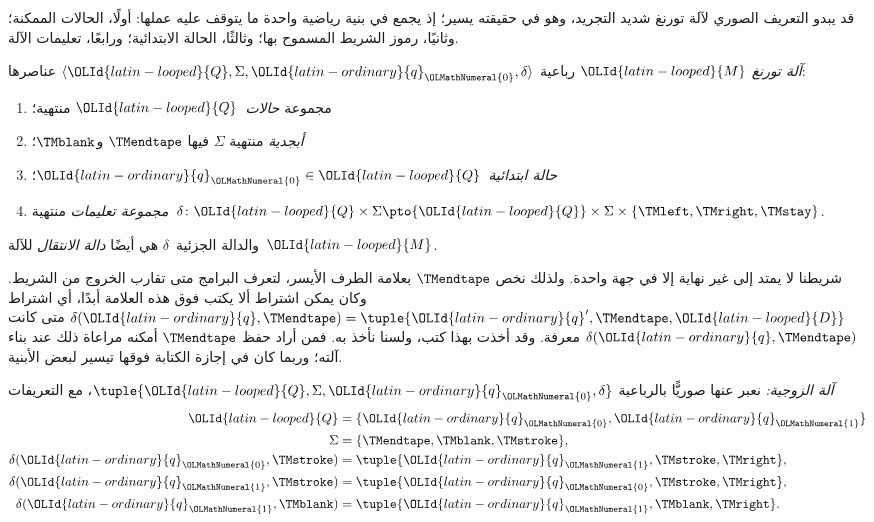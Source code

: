 \documentclass[../../../include/open-logic-section]{subfiles}
\begin{document}

\begin{explain}
قد يبدو التعريف الصوري لآلة تورنغ شديد التجريد، وهو في حقيقته يسير؛ إذ يجمع في بنية رياضية واحدة ما يتوقف عليه عملها: أولًا، الحالات الممكنة؛ وثانيًا، رموز الشريط المسموح بها؛ وثالثًا، الحالة الابتدائية؛ ورابعًا، تعليمات الآلة.
\end{explain}

\begin{defn}
\emph{آلة تورنغ} ${\OLId{latin-looped}{M}}$ رباعية $\langle {\OLId{latin-looped}{Q}},\Sigma,{\OLId{latin-ordinary}{q}}_{\OLMathNumeral{0}},\delta\rangle$ عناصرها:
\begin{enumerate}
\item مجموعة \emph{حالات}~${\OLId{latin-looped}{Q}}$ منتهية؛
\item \emph{أبجدية} منتهية $\Sigma$ فيها $\TMendtape$ و$\TMblank$؛
\item \emph{حالة ابتدائية}~${\OLId{latin-ordinary}{q}}_{\OLMathNumeral{0}} \in {\OLId{latin-looped}{Q}}$؛
\item \emph{مجموعة تعليمات} منتهية~$\delta\colon {\OLId{latin-looped}{Q}} \times \Sigma
  \pto {\OLId{latin-looped}{Q}} \times \Sigma \times \{\TMleft,\TMright,\TMstay\}$.
\end{enumerate}
والدالة الجزئية~$\delta$ هي أيضًا \emph{دالة الانتقال} للآلة~${\OLId{latin-looped}{M}}$.
\end{defn}

\begin{explain}
شريطنا لا يمتد إلى غير نهاية إلا في جهة واحدة. ولذلك نخص $\TMendtape$ بعلامة الطرف الأيسر، لتعرف البرامج متى تقارب الخروج من الشريط. وكان يمكن اشتراط ألا يكتب فوق هذه العلامة أبدًا، أي اشتراط $\delta({\OLId{latin-ordinary}{q}},\TMendtape)=\tuple{{\OLId{latin-ordinary}{q}}',\TMendtape,{\OLId{latin-looped}{D}}}$ متى كانت $\delta({\OLId{latin-ordinary}{q}},\TMendtape)$ معرفة. وقد أخذت بهذا كتب، ولسنا نأخذ به. فمن أراد حفظ $\TMendtape$ أمكنه مراعاة ذلك عند بناء آلته؛ وربما كان في إجازة الكتابة فوقها تيسير لبعض الأبنية.
\end{explain}

\begin{ex}
\emph{آلة الزوجية:} نعبر عنها صوريًّا بالرباعية $\tuple{{\OLId{latin-looped}{Q}},\Sigma,{\OLId{latin-ordinary}{q}}_{\OLMathNumeral{0}},\delta}$، مع التعريفات
\begin{align*}
{\OLId{latin-looped}{Q}} & = \{ {\OLId{latin-ordinary}{q}}_{\OLMathNumeral{0}}, {\OLId{latin-ordinary}{q}}_{\OLMathNumeral{1}} \} \\
\Sigma & = \{ \TMendtape, \TMblank, \TMstroke \}, \\
\delta({\OLId{latin-ordinary}{q}}_{\OLMathNumeral{0}}, \TMstroke) & = \tuple{{\OLId{latin-ordinary}{q}}_{\OLMathNumeral{1}}, \TMstroke, \TMright},\\
\delta({\OLId{latin-ordinary}{q}}_{\OLMathNumeral{1}}, \TMstroke) & = \tuple{{\OLId{latin-ordinary}{q}}_{\OLMathNumeral{0}}, \TMstroke, \TMright},\\
\delta({\OLId{latin-ordinary}{q}}_{\OLMathNumeral{1}}, \TMblank)  & = \tuple{{\OLId{latin-ordinary}{q}}_{\OLMathNumeral{1}}, \TMblank, \TMright}.
\end{align*}
\end{ex}
\end{document}
